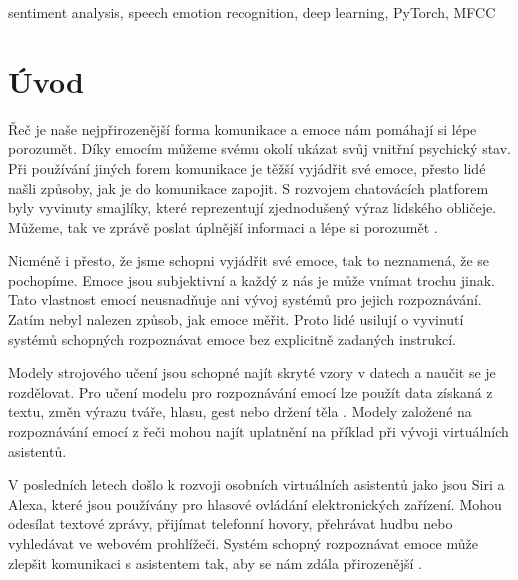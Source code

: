 \documentclass[FM,BP]{tulthesis}
\begin{document}
\begin{keywordsEN}
sentiment analysis, speech emotion recognition, deep learning, PyTorch, MFCC
\end{keywordsEN}

\clearpage

\begin{acknowledgement}
\end{acknowledgement}

\tableofcontents

\clearpage

\begin{abbrList}
\end{abbrList}

\chapter{Úvod} %
Řeč je naše nejpřirozenější forma komunikace a emoce nám pomáhají si lépe porozumět. Díky emocím můžeme svému okolí ukázat svůj vnitřní psychický stav. Při používání jiných forem komunikace je těžší vyjádřit své emoce, přesto lidé našli způsoby, jak je do komunikace zapojit. S rozvojem chatovácích platforem byly vyvinuty smajlíky, které reprezentují zjednodušený výraz lidského obličeje. Můžeme, tak ve zprávě poslat úplnější informaci a lépe si porozumět \cite{DBLP:journals/speech/AkcayO20}.

Nicméně i přesto, že jsme schopni vyjádřit své emoce, tak to neznamená, že se pochopíme. Emoce jsou subjektivní a každý z nás je může vnímat trochu jinak. Tato vlastnost emocí neusnadňuje ani vývoj systémů pro jejich rozpoznávání. Zatím nebyl nalezen způsob, jak emoce měřit. Proto lidé usilují o vyvinutí systémů schopných rozpoznávat emoce bez explicitně zadaných instrukcí.

Modely strojového učení jsou schopné najít skryté vzory v datech a naučit se je rozdělovat. Pro učení modelu pro rozpoznávání emocí lze použít data získaná z textu, změn výrazu tváře, hlasu, gest nebo držení těla \cite{konar_chakraborty_2015}. Modely založené na rozpoznávání emocí z řeči mohou najít uplatnění na příklad při vývoji virtuálních asistentů. 

V posledních letech došlo k rozvoji osobních virtuálních asistentů jako jsou Siri a Alexa, které jsou používány pro hlasové ovládání elektronických zařízení. Mohou odesílat textové zprávy, přijímat telefonní hovory, přehrávat hudbu nebo vyhledávat ve webovém prohlížeči. Systém schopný rozpoznávat emoce může zlepšit komunikaci s asistentem tak, aby se nám zdála přirozenější \cite{DBLP:journals/corr/abs-1912-10458}.
\end{document}

